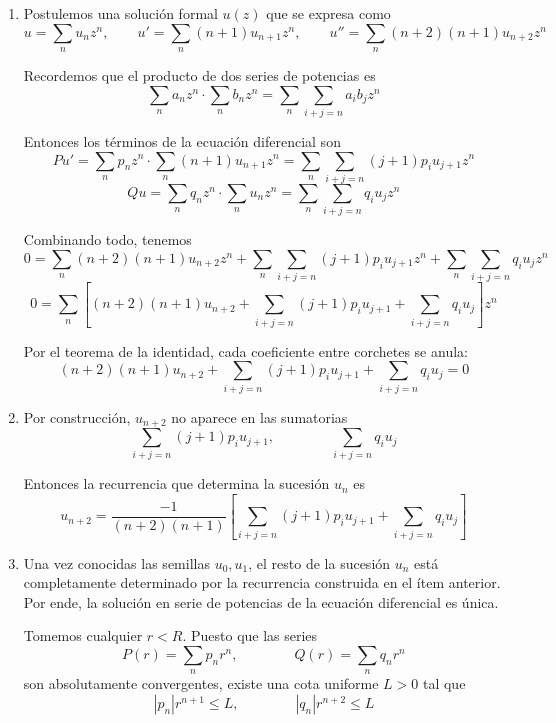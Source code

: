 \begin{solution}
\leavevmode
\begin{enumerate}[label=\alph*)]
    \item Postulemos una solución formal $u(z)$ que se expresa como
    $$
    u = \sum_n u_n z^n, \qquad
    u' = \sum_n (n+1) u_{n+1} z^n, \qquad
    u'' = \sum_n (n+2) (n+1) u_{n+2} z^n
    $$
    
    Recordemos que el producto de dos series de potencias es
    $$\sum_n a_n z^n \cdot \sum_n b_n z^n = \sum_n \sum_{i+j=n} a_i b_j z^n$$
    
    Entonces los términos de la ecuación diferencial son
    $$
    Pu'
        = \sum_n p_n z^n \cdot \sum_n (n+1) u_{n+1} z^n
        = \sum_n \sum_{i+j=n} (j+1) p_i u_{j+1} z^n
    $$
    $$
    Qu
        = \sum_n q_n z^n \cdot \sum_n u_n z^n
        = \sum_n \sum_{i+j=n} q_i u_j z^n
    $$
    
    Combinando todo, tenemos
    $$
    0
        = \sum_n (n+2) (n+1) u_{n+2} z^n
        + \sum_n \sum_{i+j=n} (j+1) p_i u_{j+1} z^n
        + \sum_n \sum_{i+j=n} q_i u_j z^n
    $$
    $$
    0 = \sum_n \left[
        (n+2) (n+1) u_{n+2} +
        \sum_{i+j=n} (j+1) p_i u_{j+1} +
        \sum_{i+j=n} q_i u_j
    \right] z^n
    $$
    
    Por el teorema de la identidad, cada coeficiente entre corchetes se anula:
    $$(n+2) (n+1) u_{n+2} + \sum_{i+j=n} (j+1) p_i u_{j+1} + \sum_{i+j=n} q_i u_j = 0$$
    
    \item Por construcción, $u_{n+2}$ no aparece en las sumatorias
    $$\sum_{i+j=n} (j+1) p_i u_{j+1}, \qquad \qquad \sum_{i+j=n} q_i u_j$$
    
    Entonces la recurrencia que determina la sucesión $u_n$ es
    $$u_{n+2} = \frac {-1} {(n+2) (n+1)} \left[
        \sum_{i+j=n} (j+1) p_i u_{j+1} +
        \sum_{i+j=n} q_i u_j \right]
    $$
    
    \item Una vez conocidas las semillas $u_0, u_1$, el resto de la sucesión $u_n$ está completamente determinado por la recurrencia construida en el ítem anterior. Por ende, la solución en serie de potencias de la ecuación diferencial es única.
    
    Tomemos cualquier $r < R$. Puesto que las series
    $$P(r) = \sum_n p_n r^n, \qquad \qquad Q(r) = \sum_n q_n r^n$$
    son absolutamente convergentes, existe una cota uniforme $L > 0$ tal que
    $$|p_n| r^{n+1} \le L, \qquad \qquad |q_n| r^{n+2} \le L$$
    

\end{enumerate}
\end{solution}
